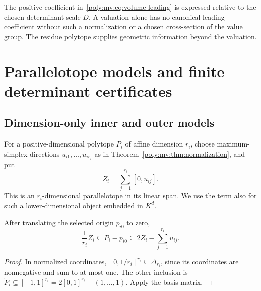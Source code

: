 \documentclass[11pt,a4paper]{article}
\numberwithin{equation}{section}
\theoremstyle{plain}
\begin{document}
The positive coefficient in~\eqref{poly:mv:eq:volume-leading} is expressed relative
to the chosen determinant scale $D$. A valuation alone has no canonical
leading coefficient without such a normalization or a chosen cross-section
of the value group. The residue polytope supplies geometric information
beyond the valuation.

\section{Parallelotope models and finite determinant certificates}
\label{poly:mv:sec:determinants}

\subsection{Dimension-only inner and outer models}
For a positive-dimensional polytope $P_i$ of affine dimension $r_i$, choose
maximum-simplex directions $u_{i1},\ldots,u_{ir_i}$ as in
Theorem~\ref{poly:mv:thm:normalization}, and put
\[
 Z_i=\sum_{j=1}^{r_i}[0,u_{ij}].
\]
This is an $r_i$-dimensional parallelotope in its linear span. We use the
term also for such a lower-dimensional object embedded in $K^d$.

\begin{lemma}
\label{poly:mv:lem:parallelotope}
After translating the selected origin $p_{i0}$ to zero,
\begin{equation}
\label{poly:mv:eq:parallelotope-sandwich}
 \frac1{r_i}Z_i\subseteq P_i-p_{i0}
   \subseteq 2Z_i-\sum_{j=1}^{r_i}u_{ij}.
\end{equation}
\end{lemma}
\begin{proof}
In normalized coordinates,
$[0,1/r_i]^{r_i}\subseteq\Delta_{r_i}$, since its coordinates are
nonnegative and sum to at most one. The other inclusion is
$\widetilde P_i\subseteq[-1,1]^{r_i}=2[0,1]^{r_i}-(1,\ldots,1)$.
Apply the basis matrix.
\end{proof}
\end{document}
